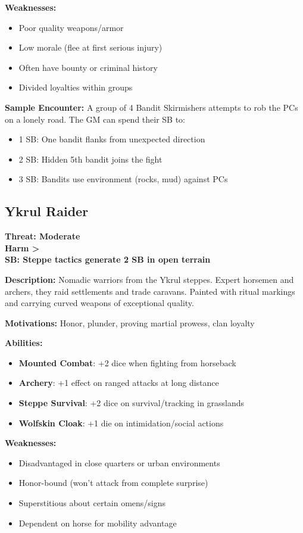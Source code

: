 \documentclass[12pt]{article}
\newcommand{\cp}[1]{\textbf{SB: #1}}
\newcommand{\harm}[1]{\textbf{Harm #1}}
\newcommand{\threat}[1]{\textbf{Threat: #1}}
\begin{document}
\textbf{Weaknesses:}
\begin{itemize}
\item Poor quality weapons/armor
\item Low morale (flee at first serious injury)
\item Often have bounty or criminal history
\item Divided loyalties within groups
\end{itemize}

\textbf{Sample Encounter:}
A group of 4 Bandit Skirmishers attempts to rob the PCs on a lonely road. The GM can spend their SB to:
\begin{itemize}
\item 1 SB: One bandit flanks from unexpected direction
\item 2 SB: Hidden 5th bandit joins the fight
\item 3 SB: Bandits use environment (rocks, mud) against PCs
\end{itemize}

\subsection*{Ykrul Raider}

\threat{Moderate} \\
\harm{>} \\
\cp{Steppe tactics generate 2 SB in open terrain}

\vspace{0.5em}
\textbf{Description:} Nomadic warriors from the Ykrul steppes. Expert horsemen and archers, they raid settlements and trade caravans. Painted with ritual markings and carrying curved weapons of exceptional quality.

\textbf{Motivations:} Honor, plunder, proving martial prowess, clan loyalty

\textbf{Abilities:}
\begin{itemize}
\item \textbf{Mounted Combat}: +2 dice when fighting from horseback
\item \textbf{Archery}: +1 effect on ranged attacks at long distance
\item \textbf{Steppe Survival}: +2 dice on survival/tracking in grasslands
\item \textbf{Wolfskin Cloak}: +1 die on intimidation/social actions
\end{itemize}

\textbf{Weaknesses:}
\begin{itemize}
\item Disadvantaged in close quarters or urban environments
\item Honor-bound (won't attack from complete surprise)
\item Superstitious about certain omens/signs
\item Dependent on horse for mobility advantage
\end{itemize}
\end{document}
